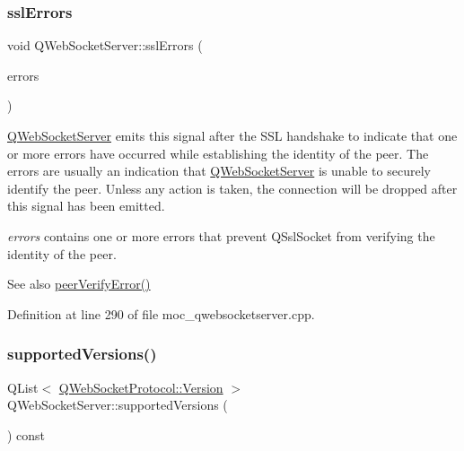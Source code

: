 \subsubsection{\texorpdfstring{ssl\+Errors}{sslErrors}}
{\footnotesize\ttfamily void Q\+Web\+Socket\+Server\+::ssl\+Errors (\begin{DoxyParamCaption}\item[{const Q\+List$<$ Q\+Ssl\+Error $>$ \&}]{errors }\end{DoxyParamCaption})\hspace{0.3cm}{\ttfamily [signal]}}

\mbox{\hyperlink{class_q_web_socket_server}{Q\+Web\+Socket\+Server}} emits this signal after the S\+SL handshake to indicate that one or more errors have occurred while establishing the identity of the peer. The errors are usually an indication that \mbox{\hyperlink{class_q_web_socket_server}{Q\+Web\+Socket\+Server}} is unable to securely identify the peer. Unless any action is taken, the connection will be dropped after this signal has been emitted.

{\itshape errors} contains one or more errors that prevent Q\+Ssl\+Socket from verifying the identity of the peer.

\begin{DoxySeeAlso}{See also}
\mbox{\hyperlink{class_q_web_socket_server_aa80990116026e853dee6aefcf728bf45}{peer\+Verify\+Error()}} 
\end{DoxySeeAlso}


Definition at line 290 of file moc\+\_\+qwebsocketserver.\+cpp.

\mbox{\label{class_q_web_socket_server_a3f745ed90c56fca215144f6a6511786e}} 
\subsubsection{\texorpdfstring{supported\+Versions()}{supportedVersions()}}
{\footnotesize\ttfamily Q\+List$<$ \mbox{\hyperlink{namespace_q_web_socket_protocol_ad53f2684577effe0a517eadb48714df3}{Q\+Web\+Socket\+Protocol\+::\+Version}} $>$ Q\+Web\+Socket\+Server\+::supported\+Versions (\begin{DoxyParamCaption}{ }\end{DoxyParamCaption}) const}

